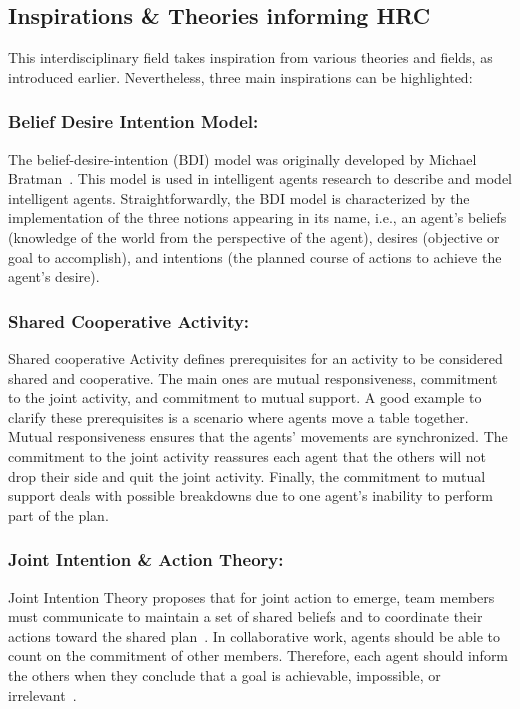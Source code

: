 \subsection{Inspirations \& Theories informing HRC}

This interdisciplinary field takes inspiration from various theories and fields, as introduced earlier. Nevertheless, three main inspirations can be highlighted:

\subsubsection*{Belief Desire Intention Model:} The belief-desire-intention (BDI) model was originally developed by Michael Bratman~\cite{Bratman1987_BRAIPA}. This model is used in intelligent agents research to describe and model intelligent agents. Straightforwardly, the BDI model is characterized by the implementation of the three notions appearing in its name, i.e., an agent's beliefs (knowledge of the world from the perspective of the agent), desires (objective or goal to accomplish), and intentions (the planned course of actions to achieve the agent's desire). 

\subsubsection*{Shared Cooperative Activity:} Shared cooperative Activity defines prerequisites for an activity to be considered shared and cooperative. The main ones are mutual responsiveness, commitment to the joint activity, and commitment to mutual support. A good example to clarify these prerequisites is a scenario where agents move a table together. Mutual responsiveness ensures that the agents' movements are synchronized. The commitment to the joint activity reassures each agent that the others will not drop their side and quit the joint activity. Finally, the commitment to mutual support deals with possible breakdowns due to one agent's inability to perform part of the plan.  

\subsubsection*{Joint Intention \& Action Theory:} 
Joint Intention Theory proposes that for joint action to emerge, team members must communicate to maintain a set of shared beliefs and to coordinate their actions toward the shared plan~\cite{cohen_teamwork_1991}. In collaborative work, agents should be able to count on the commitment of other members. Therefore, each agent should inform the others when they conclude that a goal is achievable, impossible, or irrelevant~\cite{hoffman2004collaboration}.

